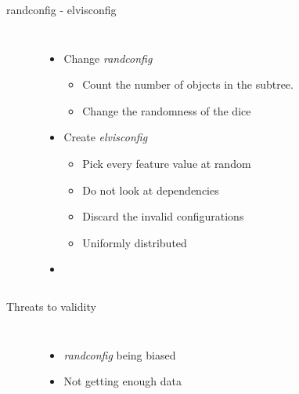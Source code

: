 \documentclass[mathserif,serif]{beamer}
\newenvironment{items}{
\begin{itemize}
  \setlength{\itemsep}{0pt}
  \setlength{\parskip}{7pt}
  \setlength{\parsep}{4pt}
}{\end{itemize}}
\begin{document}
\begin{frame}[t,fragile]{randconfig - elvisconfig}

    \begin{columns}[T]

    \begin{lstlisting}
    
    \end{lstlisting}


    \begin{items}
        \item Change \emph{randconfig} 
        \begin{items}
            \item Count the number of objects in the subtree.
            \item Change the randomness of the dice 
        \end{items}
        \item Create \emph{elvisconfig}
        \begin{items}
            \item Pick every feature value at random
            \item Do not look at dependencies
            \item Discard the invalid configurations
            \item Uniformly distributed
        \end{items}
        \item \color{red}{... Any ideas?}
    \end{items}

    \end{columns}
\end{frame}

\begin{frame}[t,fragile]{Threats to validity}

    \begin{columns}[T]

    \begin{lstlisting}
    
    \end{lstlisting}


    \begin{items}
        \item \emph{randconfig} being biased
        \item Not getting enough data
    \end{items}

    \end{columns}
\end{frame}
\end{document}
